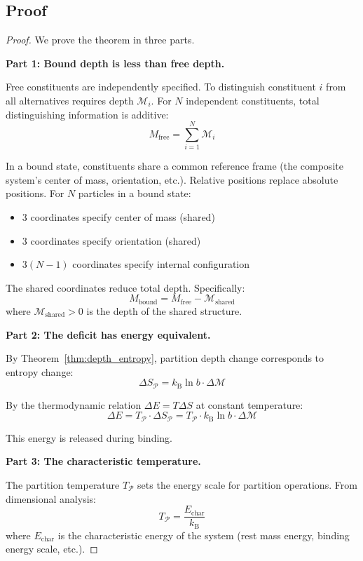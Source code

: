 \documentclass[twocolumn,10pt,a4paper]{article}
\theoremstyle{definition}
\theoremstyle{remark}
\newcommand{\kB}{k_{\mathrm{B}}}
\newcommand{\Partition}{\mathcal{P}}
\newcommand{\Depth}{\mathcal{M}}
\newcommand{\Mfree}{M_{\mathrm{free}}}
\newcommand{\Mbound}{M_{\mathrm{bound}}}
\begin{document}
\subsection{Proof}

\begin{proof}
We prove the theorem in three parts.

\textbf{Part 1: Bound depth is less than free depth.}

Free constituents are independently specified. To distinguish constituent $i$ from all alternatives requires depth $\Depth_i$. For $N$ independent constituents, total distinguishing information is additive:
\begin{equation}
    \Mfree = \sum_{i=1}^{N} \Depth_i
\end{equation}

In a bound state, constituents share a common reference frame (the composite system's center of mass, orientation, etc.). Relative positions replace absolute positions. For $N$ particles in a bound state:
\begin{itemize}
    \item 3 coordinates specify center of mass (shared)
    \item 3 coordinates specify orientation (shared)
    \item $3(N-1)$ coordinates specify internal configuration
\end{itemize}

The shared coordinates reduce total depth. Specifically:
\begin{equation}
    \Mbound = \Mfree - \Depth_{\text{shared}}
\end{equation}
where $\Depth_{\text{shared}} > 0$ is the depth of the shared structure.

\textbf{Part 2: The deficit has energy equivalent.}

By Theorem~\ref{thm:depth_entropy}, partition depth change corresponds to entropy change:
\begin{equation}
    \Delta S_{\Partition} = \kB \ln b \cdot \Delta\Depth
\end{equation}

By the thermodynamic relation $\Delta E = T \Delta S$ at constant temperature:
\begin{equation}
    \Delta E = T_{\Partition} \cdot \Delta S_{\Partition} = T_{\Partition} \cdot \kB \ln b \cdot \Delta\Depth
\end{equation}

This energy is released during binding.

\textbf{Part 3: The characteristic temperature.}

The partition temperature $T_{\Partition}$ sets the energy scale for partition operations. From dimensional analysis:
\begin{equation}
    T_{\Partition} = \frac{E_{\text{char}}}{\kB}
\end{equation}
where $E_{\text{char}}$ is the characteristic energy of the system (rest mass energy, binding energy scale, etc.).
\end{proof}
\end{document}
